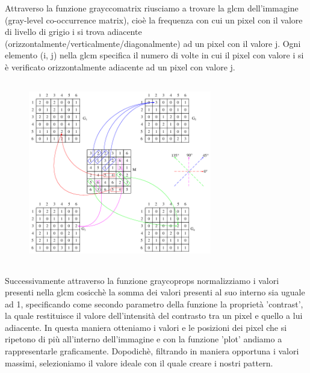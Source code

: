 \documentclass[a4paper]{article}
\begin{document}
    \setlength{\baselineskip}{0.8cm}
    {\vspace{0.5cm}\fontsize{6mm}{6mm}\selectfont Attraverso la funzione grayccomatrix riusciamo a trovare la glcm dell'immagine (gray-level co-occurrence matrix), cioè la frequenza con cui un pixel con il valore di livello di grigio i si trova adiacente (orizzontalmente/verticalmente/diagonalmente) ad un pixel con il valore j. Ogni elemento (i, j) nella glcm specifica il numero di volte in cui il pixel con valore i si è verificato orizzontalmente adiacente ad un pixel con valore j. }


    \begin{figure}[H]
        \centering
        \includegraphics[width=8cm,height=8cm,keepaspectratio]{glcm.png}
    \end{figure}

    
    \setlength{\baselineskip}{0.8cm}
    {\vspace{0.5cm}\fontsize{6mm}{6mm}\selectfont Successivamente attraverso la funzione graycoprops normalizziamo i valori presenti nella glcm cosicchè la somma dei valori presenti al suo interno sia uguale ad 1, specificando come secondo parametro della funzione la proprietà 'contrast', la quale restituisce il valore dell'intensità del contrasto tra un pixel e quello a lui adiacente. In questa maniera otteniamo i valori e le posizioni dei pixel che si ripetono di più all'interno dell'immagine e con la funzione 'plot' andiamo a rappresentarle graficamente. Dopodichè, filtrando in maniera opportuna i valori massimi, selezioniamo il valore ideale con il quale creare i nostri pattern.}
    
    \vspace{0.5cm}
    
\end{document}
